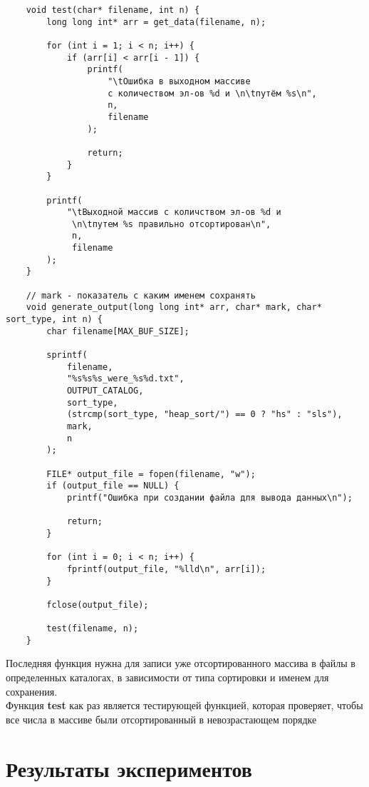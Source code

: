 \documentclass[a4paper,12pt,titlepage,finall]{article}
\begin{document}
\begin{verbatim}
    void test(char* filename, int n) {
        long long int* arr = get_data(filename, n);
    
        for (int i = 1; i < n; i++) {
            if (arr[i] < arr[i - 1]) {
                printf(
                    "\tОшибка в выходном массиве
                    с количеством эл-ов %d и \n\tпутём %s\n",
                    n,
                    filename
                );

                return;
            }
        }
    
        printf(
            "\tВыходной массив с количством эл-ов %d и
             \n\tпутем %s правильно отсортирован\n",
             n,
             filename
        );
    }
    
    // mark - показатель с каким именем сохранять 
    void generate_output(long long int* arr, char* mark, char* sort_type, int n) {
        char filename[MAX_BUF_SIZE];
    
        sprintf(
            filename,
            "%s%s%s_were_%s%d.txt",
            OUTPUT_CATALOG,
            sort_type,
            (strcmp(sort_type, "heap_sort/") == 0 ? "hs" : "sls"),
            mark,
            n
        );
    
        FILE* output_file = fopen(filename, "w");
        if (output_file == NULL) {
            printf("Ошибка при создании файла для вывода данных\n");
    
            return;
        }
    
        for (int i = 0; i < n; i++) {
            fprintf(output_file, "%lld\n", arr[i]);
        }
    
        fclose(output_file);
    
        test(filename, n);
    }
\end{verbatim}

Последняя функция нужна для записи уже отсортированного массива в файлы в определенных каталогах,
в зависимости от типа сортировки и именем для сохранения.\\
Функция \textbf{test} как раз является тестирующей функцией, 
которая проверяет, чтобы все числа в массиве были отсортированный в невозрастающем порядке


\newpage

\section{Результаты экспериментов}
\end{document}

